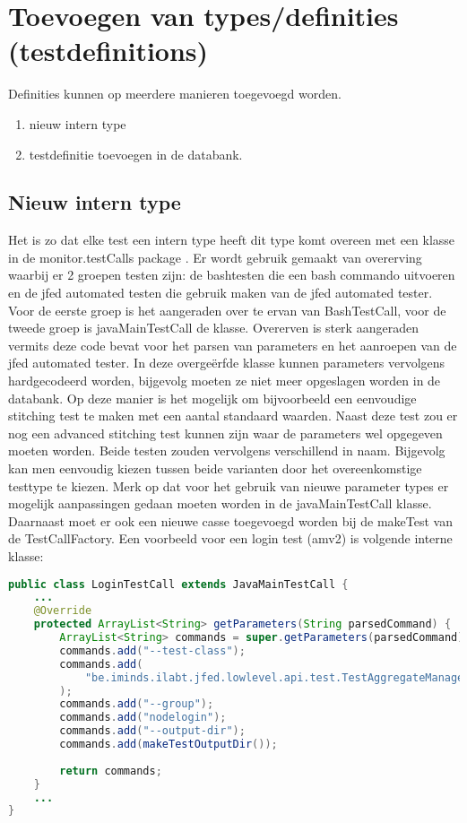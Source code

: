 \clearpage
\section{Toevoegen van types/definities (testdefinitions)}
\npar
Definities kunnen op meerdere manieren toegevoegd worden.
\begin{enumerate}
\item nieuw intern type
\item testdefinitie toevoegen in de databank.
\end{enumerate}

\subsection{Nieuw intern type}
Het is zo dat elke test een intern type heeft dit type komt overeen met een klasse in de monitor.testCalls package . Er wordt gebruik gemaakt van overerving waarbij er 2 groepen testen zijn: de bashtesten die een bash commando uitvoeren en de jfed automated testen die gebruik maken van de jfed automated tester. Voor de eerste groep is het aangeraden over te ervan van BashTestCall, voor de tweede groep is javaMainTestCall de klasse. Overerven is sterk aangeraden vermits deze code bevat voor het parsen van parameters en het aanroepen van de jfed automated tester. In deze overgeërfde klasse kunnen parameters vervolgens hardgecodeerd worden, bijgevolg moeten ze niet meer opgeslagen worden in de databank.
\npar
Op deze manier is het mogelijk om bijvoorbeeld een eenvoudige stitching test te maken met een aantal standaard waarden. Naast deze test zou er nog een advanced stitching test kunnen zijn waar de parameters wel opgegeven moeten worden. Beide testen zouden vervolgens verschillend in naam. Bijgevolg kan men eenvoudig kiezen tussen beide varianten door het overeenkomstige testtype te kiezen.
\npar
Merk op dat voor het gebruik van nieuwe parameter types er mogelijk aanpassingen gedaan moeten worden in de javaMainTestCall klasse. Daarnaast moet er ook een nieuwe casse toegevoegd worden bij de makeTest van de TestCallFactory.
\clearpage
\npar
Een voorbeeld voor een login test (amv2) is volgende interne klasse:
\begin{lstlisting}[language=Java]
public class LoginTestCall extends JavaMainTestCall {	
	...
    @Override
    protected ArrayList<String> getParameters(String parsedCommand) {
        ArrayList<String> commands = super.getParameters(parsedCommand);
        commands.add("--test-class");
        commands.add(
        	"be.iminds.ilabt.jfed.lowlevel.api.test.TestAggregateManager2"
        );
        commands.add("--group");
        commands.add("nodelogin");
        commands.add("--output-dir");
        commands.add(makeTestOutputDir());
        
        return commands;
    }
    ...
}
\end{lstlisting}
